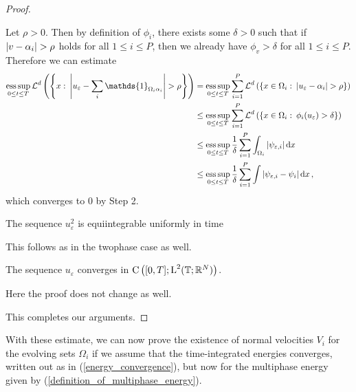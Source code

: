 \begin{proof}
\begin{description}[wide=0pt]
		Let $ \rho > 0 $. Then by definition of $ \phi_{ i } $, there exists some $ \delta > 0 $ such that if  
		$ \abs{ v - \alpha_{ i } } > \rho $ holds for all $ 1 \leq i \leq P $, then we already have $ \phi_{ v } > \delta $ for all $ 1 \leq i \leq P $.
		Therefore we can estimate
		\begin{align*}
			\esssup_{ 0 \leq t \leq T }
				\lm^{ d } \left(
					\left\{
						x 
						\, \colon \,
						\abs{ u_{ \varepsilon } - \sum_{ i } \mathds{ 1 }_{ \Omega_{ i } \alpha_{ i } } } > \rho 
					\right\}
				\right)
			& = 
			\esssup_{ 0 \leq t \leq T }
				\sum_{ i = 1 }^{ P }
					\lm^{ d }
						\left(
							\left\{
								x \in \Omega_{ i }
								\, \colon \,
								\abs{ u_{ \varepsilon } - \alpha_{ i } }
								> \rho
							\right\}	
						\right)
			\\
			& \leq
				\esssup_{ 0 \leq t \leq T }
					\sum_{ i = 1 }^{ P }
						\lm^{ d } \left(
							\left\{
								x \in \Omega_{ i }
								\, \colon \,
								\phi_{ i } ( u_{ \varepsilon } ) > \delta 
							\right\}
						\right)
			\\
			& \leq
			\esssup_{ 0 \leq t \leq T }
				\frac{ 1 }{ \delta }
				\sum_{ i = 1 }^{ P }
					\int_{ \Omega_{ i } }
						\abs{ \psi_{ \varepsilon , i } }
					\dd{ x }
			\\
			& \leq
			\esssup_{ 0 \leq t \leq T }
				\frac{ 1 }{ \delta }
				\sum_{ i = 1 }^{ P }
					\int
						\abs{ \psi_{ \varepsilon,  i } - \psi_{ i } }
					\dd{ x },
		\end{align*}
		which converges to $ 0 $ by Step 2.
		
		\item[Step 4:] The sequence $ u_{ \varepsilon }^{ 2 } $ is equiintegrable uniformly in time
		
		This follows as in the twophase case as well.
		
		\item[Step 5:] The sequence $ u_{ \varepsilon } $ converges in $ \operatorname{C} \left( [ 0 , T ] ; \operatorname{L}^{ 2 } ( \operatorname{\mathbb{T}} ; \mathbb{ R }^{ N } ) \right) $.
		
		Here the proof does not change as well.
	\end{description}
	This completes our arguments.
\end{proof}

With these estimate, we can now prove the existence of normal velocities $ V_{ i } $ for the evolving sets $ \Omega_{ i } $ if we assume that the time-integrated energies converges, written out as in (\ref{energy_convergence}), but now for the multiphase energy given by (\ref{definition_of_multiphase_energy}).

